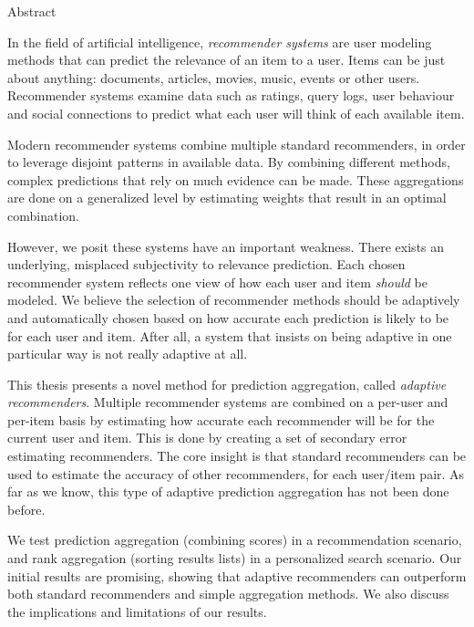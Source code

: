 \null\vspace{2em}
{
  \centering
  \normalfont
  \huge
  Abstract\\
}
\vspace{2em}

\noindent
In the field of artificial intelligence,
\emph{recommender systems} are user modeling methods
that can predict the relevance of an item to a user.
Items can be just about anything: 
documents, articles, movies, music, events or other users.
Recommender systems examine data such as ratings, query logs,
user behaviour and social connections to predict
what each user will think of each available item.

Modern recommender systems
combine multiple standard recommenders,
in order to leverage disjoint patterns in available data.
By combining different methods,
complex predictions that rely on much evidence can be made.
These aggregations are done on a generalized level
by estimating weights that result in an optimal combination.

However, we posit these systems have an important weakness.
There exists an underlying, misplaced subjectivity to relevance prediction.
Each chosen recommender system reflects one view of 
how each user and item \emph{should} be modeled.
We believe the selection of recommender methods should 
be adaptively and automatically chosen based on
how accurate each prediction is likely to be for each user and item.
After all, a system that insists on being adaptive
in one particular way is not really adaptive at all.

This thesis presents a novel method for prediction aggregation,
called \emph{adaptive recommenders}.
Multiple recommender systems are combined on a per-user and per-item basis
by estimating how accurate each recommender will be for the current user and item.
This is done by creating a set of secondary error estimating recommenders.
The core insight is that standard recommenders can be used
to estimate the accuracy of other recommenders, for each
user/item pair.
As far as we know, this type of adaptive prediction aggregation
has not been done before.

We test prediction aggregation (combining scores) in a
recommendation scenario,
and rank aggregation (sorting results lists) in a personalized search scenario.
Our initial results are promising, showing that adaptive recommenders
can outperform both standard recommenders and simple aggregation methods.
We also discuss the implications and limitations of our results.

\cleardoublepage
